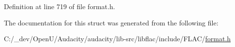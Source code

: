 Definition at line 719 of file format.\+h.



The documentation for this struct was generated from the following file\+:\begin{DoxyCompactItemize}
\item 
C\+:/\+\_\+dev/\+Open\+U/\+Audacity/audacity/lib-\/src/libflac/include/\+F\+L\+A\+C/\hyperlink{include_2_f_l_a_c_2format_8h}{format.\+h}\end{DoxyCompactItemize}
